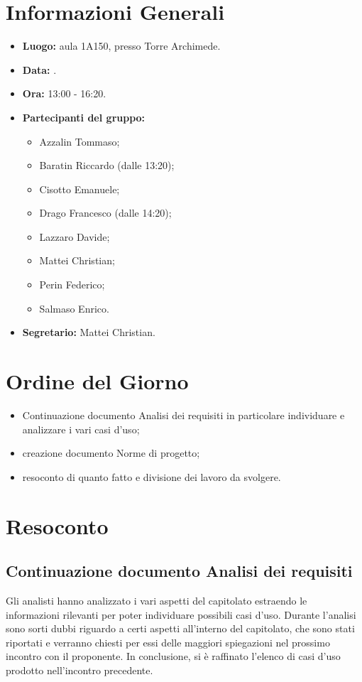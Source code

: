 \section{Informazioni Generali}
\begin{itemize}
\item \textbf{Luogo:} aula 1A150, presso Torre Archimede.
\item \textbf{Data:} \Data.
\item \textbf{Ora:} 13:00 - 16:20.
\item \textbf{Partecipanti del gruppo:}
	\begin{itemize}
		\item Azzalin Tommaso; 
		\item Baratin Riccardo (dalle 13:20);
		\item Cisotto Emanuele; 
		\item Drago Francesco (dalle 14:20);
		\item Lazzaro Davide;
		\item Mattei Christian;
		\item Perin Federico;
		\item Salmaso Enrico.
	\end{itemize} 
\item \textbf{Segretario:} Mattei Christian.
\end{itemize}


\section{Ordine del Giorno}
\begin{itemize}
	\item Continuazione documento Analisi dei requisiti in particolare individuare e analizzare i vari casi d'uso;
	\item creazione documento Norme di progetto;
	\item resoconto di quanto fatto e divisione dei lavoro da svolgere.
\end{itemize}


\section{Resoconto}
\subsection{Continuazione documento Analisi dei requisiti}
Gli analisti hanno analizzato i vari aspetti del capitolato estraendo le informazioni rilevanti per poter individuare possibili casi d’uso. Durante l’analisi sono sorti dubbi riguardo a certi aspetti all’interno del capitolato, che sono stati riportati e verranno chiesti per essi delle maggiori spiegazioni nel prossimo incontro con il proponente. In conclusione, si è raffinato l’elenco di casi d’uso prodotto nell’incontro precedente.


